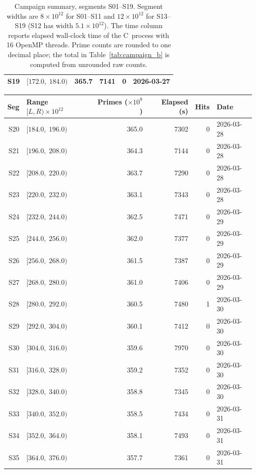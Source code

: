 \documentclass[12pt,reqno]{article}
\theoremstyle{plain}
\theoremstyle{definition}
\theoremstyle{remark}
\begin{document}
\begin{table}[ht]
\begin{center}
\begin{tabular}{rlrrrl}
S19 & $[172.0,\;184.0)$ & 365.7 & 7141 & 0 & 2026-03-27 \\
\bottomrule
\end{tabular}
\caption{Campaign summary, segments S01--S19.
Segment widths are $8 \times 10^{12}$ for S01--S11
and $12 \times 10^{12}$ for S13--S19
(S12 has width $5.1 \times 10^{12}$).
The time column reports elapsed wall-clock time of the C~process
with 16 OpenMP threads.
Prime counts are rounded to one decimal place; the total in
Table~\ref{tab:campaign_b} is computed from unrounded raw counts.}
\label{tab:campaign_a}
\end{center}
\end{table}

\begin{table}[ht]
\begin{center}
\small
\begin{tabular}{rlrrrl}
\toprule
Seg & Range $[L, R) \times 10^{12}$ & Primes ($\times 10^9$)
    & Elapsed (s) & Hits & Date \\
\midrule
S20 & $[184.0,\;196.0)$ & 365.0 & 7302 & 0 & 2026-03-28 \\
S21 & $[196.0,\;208.0)$ & 364.3 & 7144 & 0 & 2026-03-28 \\
S22 & $[208.0,\;220.0)$ & 363.7 & 7290 & 0 & 2026-03-28 \\
S23 & $[220.0,\;232.0)$ & 363.1 & 7343 & 0 & 2026-03-28 \\
S24 & $[232.0,\;244.0)$ & 362.5 & 7471 & 0 & 2026-03-29 \\
S25 & $[244.0,\;256.0)$ & 362.0 & 7377 & 0 & 2026-03-29 \\
S26 & $[256.0,\;268.0)$ & 361.5 & 7387 & 0 & 2026-03-29 \\
S27 & $[268.0,\;280.0)$ & 361.0 & 7406 & 0 & 2026-03-29 \\
S28 & $[280.0,\;292.0)$ & 360.5 & 7480 & 1 & 2026-03-30 \\
S29 & $[292.0,\;304.0)$ & 360.1 & 7412 & 0 & 2026-03-30 \\
S30 & $[304.0,\;316.0)$ & 359.6 & 7970 & 0 & 2026-03-30 \\
S31 & $[316.0,\;328.0)$ & 359.2 & 7352 & 0 & 2026-03-30 \\
S32 & $[328.0,\;340.0)$ & 358.8 & 7345 & 0 & 2026-03-30 \\
S33 & $[340.0,\;352.0)$ & 358.5 & 7434 & 0 & 2026-03-31 \\
S34 & $[352.0,\;364.0)$ & 358.1 & 7493 & 0 & 2026-03-31 \\
S35 & $[364.0,\;376.0)$ & 357.7 & 7361 & 0 & 2026-03-31 \\

\end{tabular}
\end{center}
\end{table}
\end{document}
